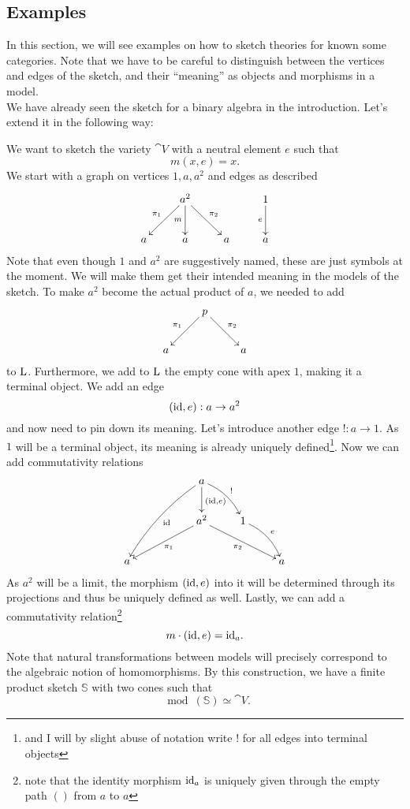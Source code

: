 \subsection{Examples}

In this section, we will see examples on how to sketch theories for known some categories. Note that we have to be careful to distinguish between the vertices and edges of the sketch, and their ``meaning'' as objects and morphisms in a model. \\

 We have already seen the sketch for a binary algebra in the introduction. Let's extend it in the following way:

\begin{Example}\label{ex:unitality}
We want to sketch the variety $\cat V$ with a neutral element $e$ such that
\[ m(x, e) = x. \]
We start with a graph on vertices $1, a, a^2$ and edges as described
\[
\xymatrix{
  & a^2 \ar[rd]^{\pi_2} \ar[d]_{m} \ar[ld]_{\pi_1} & & 1 \ar[d]_{e} \\
a & a & a & a
}\]
Note that even though $1$ and $a^2$ are suggestively named, these are just symbols at the moment. We will make them get their intended meaning in the models of the sketch. To make $a^2$ become the actual product of $a$, we needed to add
\[
\xymatrix{
  & p \ar[rd]^{\pi_2} \ar[ld]_{\pi_1} & \\
a & & a
}\]
to $\textrm{L}$. Furthermore, we add to $\textrm{L}$ the empty cone with apex $1$, making it a terminal object. We add an edge
\[ (\textrm{id},e) : a \to a^2 \]
and now need to pin down its meaning. Let's introduce another edge $! : a \to 1$. As $1$ will be a terminal object, its meaning is already uniquely defined\footnote{and I will by slight abuse of notation write $!$ for all edges into terminal objects}. Now we can add commutativity relations
\[
\xymatrix{
  & & a \ar[d]^{(\id,e)} \ar@/_/[lldd]^{\id} \ar@/^/[rd]^{!}  & & \\
  & & a^2 \ar[lld]^{\pi_1} \ar[rrd]_{\pi_2} & 1 \ar@/^/[rd]^{e} & \\
a & & & & a
}\]
As $a^2$ will be a limit, the morphism $(\textrm{id},e)$ into it will be determined through its projections and thus be uniquely defined as well. Lastly, we can add a commutativity relation\footnote{note that the identity morphism $\textrm{id}_a$ is uniquely given through the empty path $()$ from $a$ to $a$}
\[ m \cdot (\textrm{id},e) = \textrm{id}_a. \]
Note that natural transformations between models will precisely correspond to the algebraic notion of homomorphisms. By this construction, we have a finite product sketch $\mathbb S$ with two cones such that
\[ \mod(\mathbb S) \simeq \cat V. \]
\end{Example}

